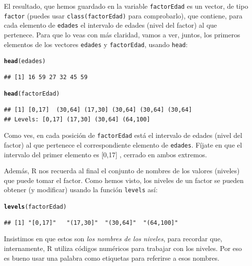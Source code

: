 \documentclass[10pt,a4paper]{article}\usepackage[]{graphicx}\usepackage[]{color}
\makeatletter
\newcommand{\hlstd}[1]{\textcolor[rgb]{0.345,0.345,0.345}{#1}}%
\newcommand{\hlkwd}[1]{\textcolor[rgb]{0.737,0.353,0.396}{\textbf{#1}}}%
\newenvironment{kframe}{%
 \def\at@end@of@kframe{}%
 \ifinner\ifhmode%
  \def\at@end@of@kframe{\end{minipage}}%
  \begin{minipage}{\columnwidth}%
 \fi\fi%
 \def\FrameCommand##1{\hskip\@totalleftmargin \hskip-\fboxsep
 \colorbox{shadecolor}{##1}\hskip-\fboxsep
     \hskip-\linewidth \hskip-\@totalleftmargin \hskip\columnwidth}%
 \MakeFramed {\advance\hsize-\width
   \@totalleftmargin\z@ \linewidth\hsize
   \@setminipage}}%
 {\par\unskip\endMakeFramed%
 \at@end@of@kframe}
\newenvironment{knitrout}{}{} %
\newcounter {cont01}
\makeatother
\begin{document}
El resultado, que hemos guardado en la variable {\tt factorEdad} es un vector, de tipo {\tt factor} (puedes usar {\tt class(factorEdad)} para comprobarlo), que contiene, para cada elemento de {\tt edades} el intervalo de edades (nivel del factor) al que pertenece. Para que lo veas con más claridad, vamos a ver, juntos, los primeros elementos de los vectores {\tt edades} y {\tt factorEdad}, usando {\tt head}:

\begin{knitrout}
\color{fgcolor}\begin{kframe}
\begin{alltt}
\hlkwd{head}\hlstd{(edades)}
\end{alltt}
\begin{verbatim}
## [1] 16 59 27 32 45 59
\end{verbatim}
\begin{alltt}
\hlkwd{head}\hlstd{(factorEdad)}
\end{alltt}
\begin{verbatim}
## [1] [0,17]  (30,64] (17,30] (30,64] (30,64] (30,64]
## Levels: [0,17] (17,30] (30,64] (64,100]
\end{verbatim}
\end{kframe}
\end{knitrout}

Como ves, en cada posición de {\tt factorEdad} está el intervalo de edades (nivel del factor) al que pertenece el correspondiente elemento de {\tt edades}. Fíjate en que el intervalo del primer elemento es  [0,17] %
, cerrado en ambos extremos.

Además, R nos  recuerda al final el conjunto de nombres de los valores (niveles) que puede tomar el factor. Como hemos visto, los niveles de un factor se pueden obtener (y modificar) usando la función {\tt levels} así:
\begin{knitrout}
\color{fgcolor}\begin{kframe}
\begin{alltt}
\hlkwd{levels}\hlstd{(factorEdad)}
\end{alltt}
\begin{verbatim}
## [1] "[0,17]"   "(17,30]"  "(30,64]"  "(64,100]"
\end{verbatim}
\end{kframe}
\end{knitrout}
Insistimos en que estos son {\em los nombres de los niveles}, para recordar que, internamente, R utiliza códigos numéricos para trabajar con los niveles. Por eso es bueno usar una palabra como {\sf etiquetas} para referirse a esos nombres.
\end{document}
